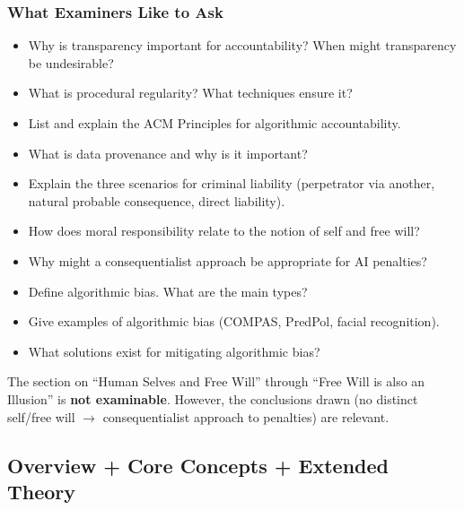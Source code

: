 \separator

\subsubsection*{What Examiners Like to Ask}

\begin{itemize}
  \item Why is transparency important for accountability? When might transparency be undesirable?
  \item What is procedural regularity? What techniques ensure it?
  \item List and explain the ACM Principles for algorithmic accountability.
  \item What is data provenance and why is it important?
  \item Explain the three scenarios for criminal liability (perpetrator via another, natural probable consequence, direct liability).
  \item How does moral responsibility relate to the notion of self and free will?
  \item Why might a consequentialist approach be appropriate for AI penalties?
  \item Define algorithmic bias. What are the main types?
  \item Give examples of algorithmic bias (COMPAS, PredPol, facial recognition).
  \item What solutions exist for mitigating algorithmic bias?
\end{itemize}

\begin{tipbox}
The section on ``Human Selves and Free Will'' through ``Free Will is also an Illusion'' is \textbf{not examinable}. However, the conclusions drawn (no distinct self/free will $\to$ consequentialist approach to penalties) are relevant.
\end{tipbox}

\bigseparator

\subsection{Overview + Core Concepts + Extended Theory}

